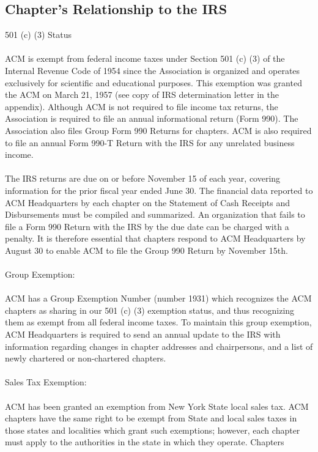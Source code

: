 \subsection{Chapter's Relationship to the IRS}
501 (c) (3) Status
\\
\\
ACM is exempt from federal income taxes under Section 501 (c) (3) of the
Internal Revenue Code of 1954 since the Association is organized and operates
exclusively for scientific and educational purposes. This exemption was granted
the ACM on March 21, 1957 (see copy of IRS determination letter in the appendix).
Although ACM is not required to file income tax returns, the Association is
required to file an annual informational return (Form 990). The Association also
files Group Form 990 Returns for chapters. ACM is also required to file an annual
Form 990-T Return with the IRS for any unrelated business income.
\\
\\
The IRS returns are due on or before November 15 of each year, covering
information for the prior fiscal year ended June 30. The financial data reported
to ACM Headquarters by each chapter on the Statement of Cash Receipts and
Disbursements must be compiled and summarized. An organization that fails to
file a Form 990 Return with the IRS by the due date can be charged with a
penalty. It is therefore essential that chapters respond to ACM Headquarters
by August 30 to enable ACM to file the Group 990 Return by November 15th.
\\
\\
Group Exemption:
\\
\\
ACM has a Group Exemption Number (number 1931) which recognizes the ACM chapters
as sharing in our 501 (c) (3) exemption status, and thus recognizing them as
exempt from all federal income taxes. To maintain this group exemption, ACM
Headquarters is required to send an annual update to the IRS with information
regarding changes in chapter addresses and chairpersons, and a list of newly
chartered or non-chartered chapters.
\\
\\
Sales Tax Exemption:
\\
\\
ACM has been granted an exemption from New York State local sales tax. ACM
chapters have the same right to be exempt from State and local sales taxes in
those states and localities which grant such exemptions; however, each chapter
must apply to the authorities in the state in which they operate. Chapters
